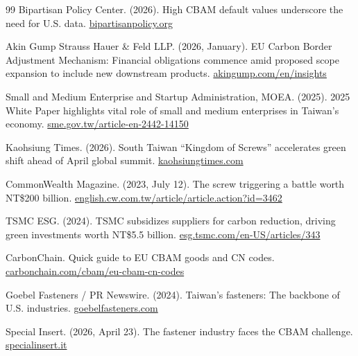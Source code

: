 \begin{thebibliography}{99}
 Bipartisan Policy Center. (2026). High CBAM default values
underscore the need for U.S. data.
\href{https://bipartisanpolicy.org/article/high-cbam-default-values-underscore-the-need-for-u-s-data/}{bipartisanpolicy.org}

 Akin Gump Strauss Hauer \& Feld LLP. (2026, January). EU Carbon
Border Adjustment Mechanism: Financial obligations commence amid proposed scope
expansion to include new downstream products.
\href{https://www.akingump.com/en/insights/alerts/eu-carbon-border-adjustment-mechanism-financial-obligations-commence-amid-proposed-scope-expansion-to-include-new-downstream-products}{akingump.com/en/insights}

 Small and Medium Enterprise and Startup Administration, MOEA.
(2025). 2025 White Paper highlights vital role of small and medium enterprises
in Taiwan's economy.
\href{https://www.sme.gov.tw/article-en-2442-14150}{sme.gov.tw/article-en-2442-14150}

 Kaohsiung Times. (2026). South Taiwan ``Kingdom of Screws''
accelerates green shift ahead of April global summit.
\href{https://www.kaohsiungtimes.com/south-taiwan-kingdom-of-screws-accelerates-green-shift-ahead-of-april-global-summit-at-the-kaohsiung-exhibition-center/}{kaohsiungtimes.com}

 CommonWealth Magazine. (2023, July 12). The screw triggering a
battle worth NT\$200 billion.
\href{https://english.cw.com.tw/article/article.action?id=3462}{english.cw.com.tw/article/article.action?id=3462}

 TSMC ESG. (2024). TSMC subsidizes suppliers for carbon
reduction, driving green investments worth NT\$5.5 billion.
\href{https://esg.tsmc.com/en-US/articles/343}{esg.tsmc.com/en-US/articles/343}

 CarbonChain. Quick guide to EU CBAM goods and CN codes.
\href{https://www.carbonchain.com/cbam/eu-cbam-cn-codes}{carbonchain.com/cbam/eu-cbam-cn-codes}

 Goebel Fasteners / PR Newswire. (2024). Taiwan's fasteners:
The backbone of U.S. industries.
\href{https://www.goebelfasteners.com/taiwans-fasteners-the-backbone-of-us-industries/}{goebelfasteners.com}

 Special Insert. (2026, April 23). The fastener industry
faces the CBAM challenge.
\href{https://www.specialinsert.it/en/2026/04/23/fastener-industry-carbon-border-adjustment-mechanism-cbam/}{specialinsert.it}


\end{thebibliography}
